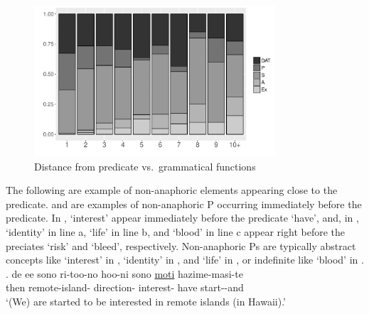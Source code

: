 \begin{figure}
	\begin{center}
	\includegraphics[width=0.8\textwidth]{figure/DiffASP.pdf}
	\caption{Distance from predicate vs.~grammatical functions}
	\label{WO:Prep:New:DiffASPF}
	\end{center}
\end{figure}


The following are example of non-anaphoric elements appearing close to the predicate.
\Next and \NNext are examples of non-anaphoric P occurring immediately before the predicate.
In \Next,
 `interest' appear immediately before the predicate  `have',
and, in \NNext,
 `identity' in line a,  `life' in line b, and  `blood' in line c appear right before the preciates  `risk' and  `bleed', respectively.
Non-anaphoric Ps are typically abstract concepts like  `interest' in \Next,  `identity' in \NNext[a], and  `life' in \NNext[b], or
indefinite like  `blood' in \NNext[c].
%
\exg. de ee sono ri-too-no hoo-ni sono  \ul{moti} hazime-masi-te \\
		then \ab{fl}  remote-island- direction-  interest- have start--and \\
	`(We) are started to be interested in remote islands (in Hawaii).'

